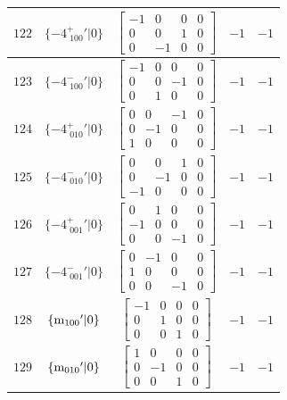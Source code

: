 \documentclass[fleqn,8pt]{jsarticle}
\begin{document}
\begin{longtable}{ccccc}
$ 122 $ & $ \{-4^{+}_{\,\,100}{}'|0\} $ & $ \begin{bmatrix} -1 & 0 & 0 & 0 \\ 0 & 0 & 1 & 0 \\ 0 & -1 & 0 & 0 \end{bmatrix} $ & $ -1 $ & $ -1 $ \\ \hline
$ 123 $ & $ \{-4^{-}_{\,\,100}{}'|0\} $ & $ \begin{bmatrix} -1 & 0 & 0 & 0 \\ 0 & 0 & -1 & 0 \\ 0 & 1 & 0 & 0 \end{bmatrix} $ & $ -1 $ & $ -1 $ \\ \hline
$ 124 $ & $ \{-4^{+}_{\,\,010}{}'|0\} $ & $ \begin{bmatrix} 0 & 0 & -1 & 0 \\ 0 & -1 & 0 & 0 \\ 1 & 0 & 0 & 0 \end{bmatrix} $ & $ -1 $ & $ -1 $ \\ \hline
$ 125 $ & $ \{-4^{-}_{\,\,010}{}'|0\} $ & $ \begin{bmatrix} 0 & 0 & 1 & 0 \\ 0 & -1 & 0 & 0 \\ -1 & 0 & 0 & 0 \end{bmatrix} $ & $ -1 $ & $ -1 $ \\ \hline
$ 126 $ & $ \{-4^{+}_{\,\,001}{}'|0\} $ & $ \begin{bmatrix} 0 & 1 & 0 & 0 \\ -1 & 0 & 0 & 0 \\ 0 & 0 & -1 & 0 \end{bmatrix} $ & $ -1 $ & $ -1 $ \\ \hline
$ 127 $ & $ \{-4^{-}_{\,\,001}{}'|0\} $ & $ \begin{bmatrix} 0 & -1 & 0 & 0 \\ 1 & 0 & 0 & 0 \\ 0 & 0 & -1 & 0 \end{bmatrix} $ & $ -1 $ & $ -1 $ \\ \hline
$ 128 $ & $ \{{\rm m}_{100}{}'|0\} $ & $ \begin{bmatrix} -1 & 0 & 0 & 0 \\ 0 & 1 & 0 & 0 \\ 0 & 0 & 1 & 0 \end{bmatrix} $ & $ -1 $ & $ -1 $ \\ \hline
$ 129 $ & $ \{{\rm m}_{010}{}'|0\} $ & $ \begin{bmatrix} 1 & 0 & 0 & 0 \\ 0 & -1 & 0 & 0 \\ 0 & 0 & 1 & 0 \end{bmatrix} $ & $ -1 $ & $ -1 $ \\ \hline

\end{longtable}
\end{document}
